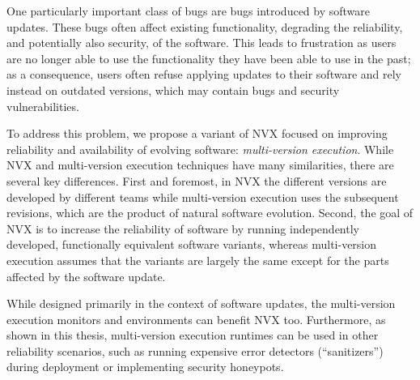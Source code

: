 
One particularly important class of bugs are bugs introduced by software
updates. These bugs often affect existing functionality, degrading the
reliability, and potentially also security, of the software. This leads to
frustration as users are no longer able to use the functionality they have been
able to use in the past; as a consequence, users often refuse applying updates
to their software and rely instead on outdated versions, which may contain bugs
and security vulnerabilities.

To address this problem, we propose a variant of NVX focused on improving
reliability and availability of evolving software: \emph{multi-version
execution}.  While NVX and multi-version execution techniques have many
similarities, there are several key differences.  First and foremost, in NVX
the different versions are developed by different teams while multi-version
execution uses the subsequent revisions, which are the product of natural
software evolution. Second, the goal of NVX is to increase the reliability of
software by running independently developed, functionally equivalent software
variants, whereas multi-version execution assumes that the variants are largely
the same except for the parts affected by the software update.

While designed primarily in the context of software updates, the multi-version
execution monitors and environments can benefit NVX too. Furthermore, as shown
in this thesis, multi-version execution runtimes can be used in other
reliability scenarios, such as running expensive error detectors
(``sanitizers'') during deployment or implementing security honeypots.


